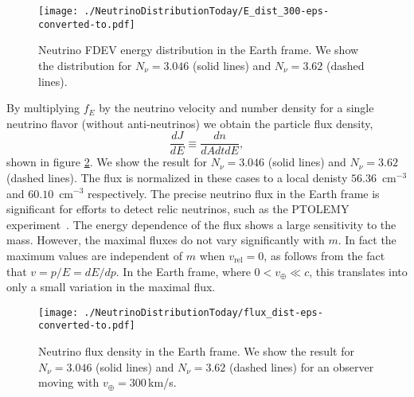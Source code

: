 \begin{figure}%
\centerline{\texttt{[image: ./NeutrinoDistributionToday/E\_dist\_300-eps-converted-to.pdf]}}
\caption{Neutrino FDEV energy distribution in the Earth frame. We show the distribution for $N_\nu=3.046$ (solid lines) and $N_\nu=3.62$ (dashed lines). }\label{fig:E_dist_300}
 \end{figure}

By multiplying $f_E$ by the neutrino velocity and number density for a single neutrino flavor (without anti-neutrinos) we obtain the particle flux density,
 \begin{equation}
 \frac{dJ}{dE}\equiv\frac{dn}{dAdtdE},
\end{equation} 
shown in figure \ref{fig:flux_dist}. We show the result for $N_\nu=3.046$ (solid lines) and $N_\nu=3.62$ (dashed lines). The flux is normalized in these cases to a local denisty $56.36$~cm${}^{-3}$ and $60.10$~cm${}^{-3}$ respectively. The precise neutrino flux in the Earth frame is significant for efforts to detect relic neutrinos, such as the PTOLEMY experiment~\cite{PTOLEMY}. The energy dependence of the flux shows a large sensitivity to the mass. However, the maximal fluxes do not vary significantly with $m$. In fact the maximum values are independent of $m$ when $v_{\text{rel}}=0$, as follows from the fact that $v=p/E=dE/dp$.  In the Earth frame, where $0<v_\oplus\ll c$, this translates into only a small variation in the maximal flux.
\begin{figure}%
\centerline{\texttt{[image: ./NeutrinoDistributionToday/flux\_dist-eps-converted-to.pdf]}}
\caption{Neutrino flux density in the Earth frame. We show the result for $N_\nu=3.046$ (solid lines) and $N_\nu=3.62$ (dashed lines) for an observer moving with $v_\oplus=300$\,km/s.}\label{fig:flux_dist}
 \end{figure}

